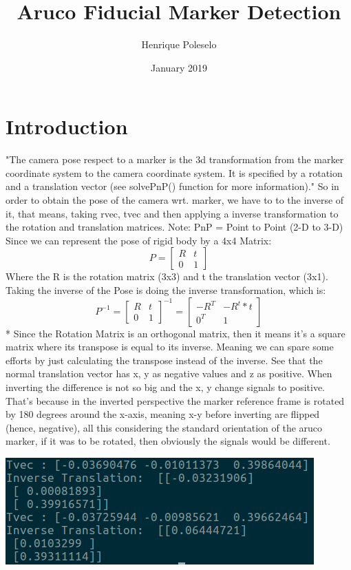 \documentclass{article}
\title{Aruco Fiducial Marker Detection}
\author{Henrique Poleselo }
\date{January 2019}
\begin{document}
\maketitle

\section{Introduction}
"The camera pose respect to a marker is the 3d transformation from the marker coordinate system to the camera coordinate system. It is specified by a rotation and a translation vector (see solvePnP() function for more information)." So in order to obtain the pose of the camera wrt. marker, we have to to the inverse of it, that means, taking rvec, tvec and then applying a inverse transformation to the rotation and translation matrices.
Note: PnP = Point to Point (2-D to 3-D)
Since we can represent the pose of rigid body by a 4x4 Matrix:
\[
P=
  \begin{bmatrix}
    R & t \\
    0 & 1
  \end{bmatrix}
\]
Where the R is the rotation matrix (3x3) and t the translation vector (3x1).
Taking the inverse of the Pose is doing the inverse transformation, which is:
\[
P^{-1}=
  \begin{bmatrix}
    R & t \\
    0 & 1
  \end{bmatrix}^{-1}
  =
  \begin{bmatrix}
  -R^T & -R^t*t \\
  0^T & 1
  \end{bmatrix}
\]
* Since the Rotation Matrix is an orthogonal matrix, then it means it’s a square matrix where its transpose is equal to its inverse. Meaning we can spare some efforts by just calculating the transpose instead of the inverse.
See that the normal translation vector has x, y as negative values and z as positive. When inverting the difference is not so big and the x, y change signals to positive. That's because in the inverted perspective the marker reference frame is rotated by 180 degrees around the x-axis, meaning x-y before inverting are flipped (hence, negative), all this considering the standard orientation of the aruco marker, if it was to be rotated, then obviously the signals would be different.
\begin{center}
  \includegraphics[scale=0.5]{invertrans.png}
\end{center}
\end{document}
